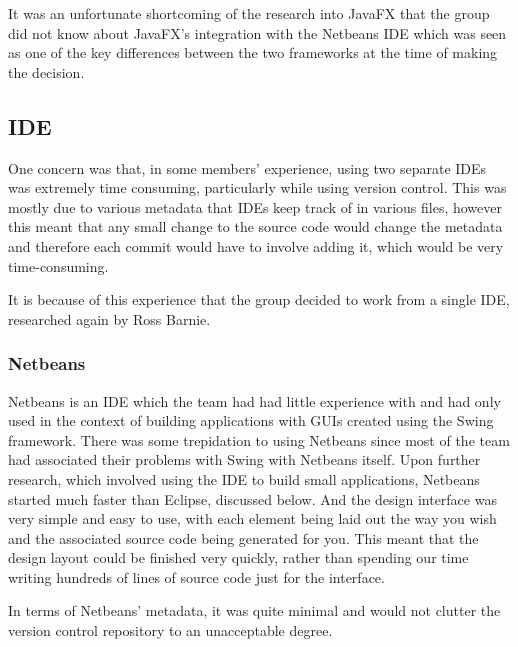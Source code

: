 It was an unfortunate shortcoming of the research into JavaFX that the
group did not know about JavaFX's integration with the Netbeans IDE
which was seen as one of the key differences between the two
frameworks at the time of making the decision.


\subsection{IDE}
\label{impl:ui:ide}

One concern was that, in some members' experience, using two separate
IDEs was extremely time consuming, particularly while using version
control.
This was mostly due to various metadata that IDEs keep track of in
various files, however this meant that any small change to the source
code would change the metadata and therefore each commit would have to
involve adding it, which would be very time-consuming.

It is because of this experience that the group decided to work from a
single IDE, researched again by Ross Barnie.

\subsubsection{Netbeans}
\label{impl:ui:ide:netbeans}

Netbeans is an IDE which the team had had little experience with and had
only used in the context of building applications with GUIs created
using the Swing framework.
There was some trepidation to using Netbeans since most of the team
had associated their problems with Swing with Netbeans itself.
Upon further research, which involved using the IDE to build small
applications, Netbeans started much faster than Eclipse, discussed
below.
And the design interface was very simple and easy to use, with each
element being laid out the way you wish and the associated source code
being generated for you.
This meant that the design layout could be finished very quickly,
rather than spending our time writing hundreds of lines of source code
just for the interface.

In terms of Netbeans' metadata, it was quite minimal and would not
clutter the version control repository to an unacceptable degree.

